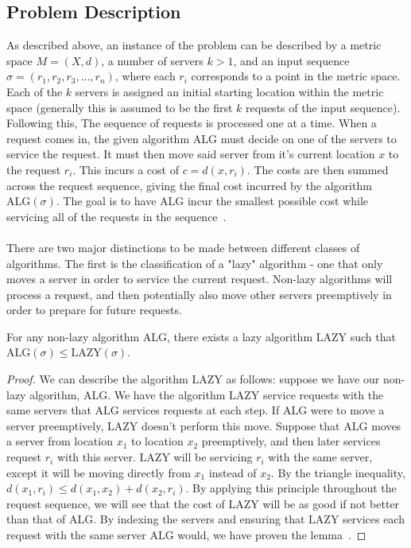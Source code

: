 \subsection{Problem Description}
\label{sec:desc}
As described above, an instance of the \KS problem can be described by a metric space $M = (X, d)$, a number of servers $k>1$, and an input sequence $\sigma = (r_1, r_2, r_3, ..., r_n)$, where each $r_i$ corresponds to a point in the metric space. Each of the $k$ servers is assigned an initial starting location within the metric space (generally this is assumed to be the first $k$ requests of the input sequence). Following this, The sequence of requests is processed one at a time. When a request comes in, the given algorithm $\mathrm{ALG}$ must decide on one of the servers to service the request. It must then move said server from it's current location $x$ to the request $r_i$. This incurs a cost of $c = d(x, r_i)$. The costs are then summed across the request sequence, giving the final cost incurred by the algorithm $\mathrm{ALG}(\sigma)$. The goal is to have $\mathrm{ALG}$ incur the smallest possible cost while servicing all of the requests in the sequence~\cite{OnlineComp1998}.
\\ \\
There are two major distinctions to be made between different classes of algorithms. The first is the classification of a "lazy" algorithm - one that only moves a server in order to service the current request. Non-lazy algorithms will process a request, and then potentially also move other servers preemptively in order to prepare for future requests. 

\begin{lemma}
    For any non-lazy algorithm $\mathrm{ALG}$, there exists a lazy algorithm $\mathrm{LAZY}$ such that $\mathrm{ALG}(\sigma) \leq \mathrm{LAZY}(\sigma)$.
\end{lemma}

\begin{proof}
    We can describe the algorithm $\mathrm{LAZY}$ as follows: suppose we have our non-lazy algorithm, $\mathrm{ALG}$. We have the algorithm $\mathrm{LAZY}$ service requests with the same servers that $\mathrm{ALG}$ services requests at each step. If $\mathrm{ALG}$ were to move a server preemptively, $\mathrm{LAZY}$ doesn't perform this move. Suppose that $\mathrm{ALG}$ moves a server from location $x_1$ to location $x_2$ preemptively, and then later services request $r_i$ with this server. $\mathrm{LAZY}$ will be servicing $r_i$ with the same server, except it will be moving directly from $x_1$ instead of $x_2$. By the triangle inequality, $d(x_1, r_i) \leq d(x_1, x_2) + d(x_2, r_i)$. By applying this principle throughout the request sequence, we will see that the cost of $\mathrm{LAZY}$ will be as good if not better than that of $\mathrm{ALG}$. By indexing the servers and ensuring that $\mathrm{LAZY}$ services each request with the same server $\mathrm{ALG}$ would, we have proven the lemma~\cite{OnlineComp1998}.
\end{proof}

